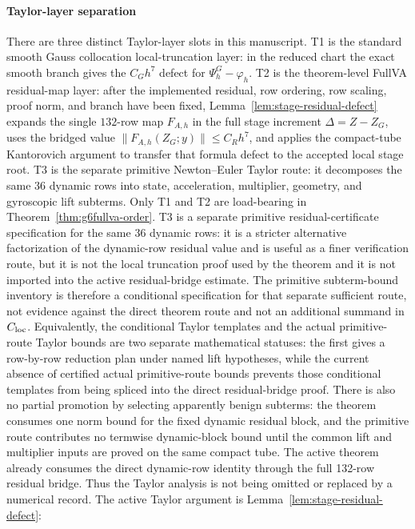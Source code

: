 \documentclass[preprint,12pt]{elsarticle}
\begin{document}
\paragraph{Taylor-layer separation}
There are three distinct Taylor-layer slots in this manuscript.  T1 is the
standard smooth Gauss collocation local-truncation layer: in the reduced chart
the exact smooth branch gives the \(C_Gh^7\) defect for
\(\Psi_h^G-\varphi_h\).  T2 is the theorem-level FullVA residual-map layer:
after the implemented residual, row ordering, row scaling, proof norm, and
branch have been fixed, Lemma~\ref{lem:stage-residual-defect} expands the
single \(132\)-row map \(F_{A,h}\) in the full stage increment
\(\Delta=Z-Z_G\), uses the bridged value
\(\|F_{A,h}(Z_G;y)\|\le C_Rh^7\), and applies the compact-tube
Kantorovich argument to transfer that formula defect to the accepted local
stage root.  T3 is the separate primitive Newton--Euler Taylor route: it
decomposes the same 36 dynamic rows into state, acceleration, multiplier,
geometry, and gyroscopic lift subterms.  Only T1 and T2 are load-bearing in
Theorem~\ref{thm:g6fullva-order}.  T3 is a separate primitive
residual-certificate specification for the same 36 dynamic rows:
it is a stricter alternative factorization of the dynamic-row residual value
and is useful as a finer verification route, but it is not the local
truncation proof used by the theorem and it is not imported into the active
residual-bridge estimate.  The primitive subterm-bound inventory is therefore
a conditional specification for that separate sufficient route, not evidence
against the direct theorem route and not an additional summand in \(C_{\rm loc}\).
Equivalently, the conditional Taylor templates and the actual primitive-route
Taylor bounds are two separate mathematical statuses: the first gives a
row-by-row reduction plan under named lift hypotheses, while the current
absence of certified actual primitive-route bounds prevents those conditional
templates from being spliced into the direct residual-bridge proof.
There is also no partial promotion by selecting apparently benign subterms:
the theorem consumes one norm bound for the fixed dynamic residual block, and
the primitive route contributes no termwise dynamic-block bound until the
common lift and multiplier inputs are proved on the same compact tube.
The active theorem already consumes the direct dynamic-row identity through
the full 132-row residual bridge.
Thus the Taylor analysis is not being omitted or replaced by a numerical
record.  The active Taylor argument is Lemma~\ref{lem:stage-residual-defect}:
\end{document}
